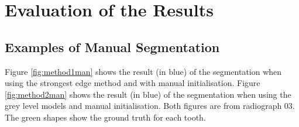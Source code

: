 \documentclass[11pt]{article}
\begin{document}
\section{Evaluation of the Results}

\subsection{Examples of Manual Segmentation}

Figure \ref{fig:method1man} shows the result (in blue) of the segmentation when using the strongest edge method and with manual initialisation. Figure \ref{fig:method2man} shows the result (in blue) of the segmentation when using the grey level models and manual initialisation. Both figures are from radiograph 03. The green shapes show the ground truth for each tooth.
\end{document}
